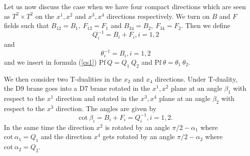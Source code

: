 \documentclass[a4paper,12pt]{article}
\begin{document}
Let us now discuss the case when we have four compact directions which are
seen as $T^2 \times T^2$ on the $x^1, x^2$ and $x^3, x^4$ directions 
respectively. We turn on $B$ and $F$ fields such that 
$B_{12} = B_{1},~F_{12} = F_{1}$ and 
$B_{34} = B_{2},~F_{34} = F_{2}$.
Then we define 
\begin{equation}
Q_{i}^{-1} = B_{i} + F_{i}, i = 1, 2
\end{equation} 
and 
\begin{equation}
\theta_{i}^{-1} = B_{i}, i = 1, 2
\end{equation}
and we insert in formula (\ref{cs1}) $\mbox{Pf}~Q = Q_1~Q_2$
and $\mbox{Pf}~\theta = \theta_1~\theta_2$. 

We then consider two T-dualities
in the $x_2$ and $x_4$ directions. Under T-duality, the D9 brane goes 
into a D7 brane rotated in the $x^1, x^2$ plane at an angle
$\beta_{1}$ with respect to the $x^1$ direction and rotated in the 
$x^3, x^4$ plane at an angle $\beta_2$ with respect to the
$x^3$ direction. The angles are given by
\begin{equation}
\mbox{cot}~\beta_i = B_i + F_i = Q_i^{-1}, i = 1, 2.
\end{equation}
In the same time the direction $x^2$ is rotated by an angle
$\pi/2 - \alpha_1$ where $\mbox{cot}~\alpha_1 = Q_1$ 
and the direction $x^4$ gets rotated by an angle $\pi/2 - \alpha_2$
where $\mbox{cot}~\alpha_2 = Q_2$. 
\end{document}
